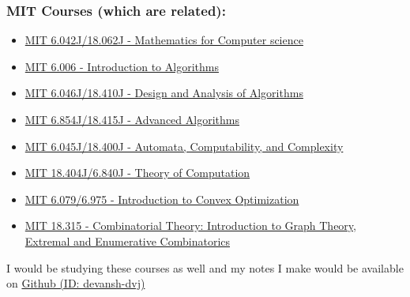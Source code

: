 \subsubsection*{MIT Courses (which are related):}
\vspace{-2mm}
\begin{itemize}[itemsep = -1 mm]
  \item \href{https://ocw.mit.edu/courses/electrical-engineering-and-computer-science/6-042j-mathematics-for-computer-science-fall-2010/}{MIT 6.042J/18.062J - Mathematics for Computer science}
  \item \href{https://ocw.mit.edu/courses/electrical-engineering-and-computer-science/6-006-introduction-to-algorithms-fall-2011/}{MIT 6.006 - Introduction to Algorithms}
  \item \href{https://ocw.mit.edu/courses/electrical-engineering-and-computer-science/6-046j-design-and-analysis-of-algorithms-spring-2015/}{MIT 6.046J/18.410J - Design and Analysis of Algorithms}
  \item \href{https://ocw.mit.edu/courses/electrical-engineering-and-computer-science/6-854j-advanced-algorithms-fall-2008/index.htm}{MIT 6.854J/18.415J - Advanced Algorithms}
  \item \href{https://ocw.mit.edu/courses/electrical-engineering-and-computer-science/6-045j-automata-computability-and-complexity-spring-2011/}{MIT 6.045J/18.400J - Automata, Computability, and Complexity}
  \item \href{https://ocw.mit.edu/courses/mathematics/18-404j-theory-of-computation-fall-2006/}{MIT 18.404J/6.840J - Theory of Computation}
  \item \href{https://ocw.mit.edu/courses/electrical-engineering-and-computer-science/6-079-introduction-to-convex-optimization-fall-2009/}{MIT 6.079/6.975 - Introduction to Convex Optimization}
  \item \href{https://ocw.mit.edu/courses/mathematics/18-315-combinatorial-theory-introduction-to-graph-theory-extremal-and-enumerative-combinatorics-spring-2005/}{MIT 18.315 - Combinatorial Theory: Introduction to Graph Theory, Extremal and Enumerative Combinatorics}
\end{itemize}

\noindent
I would be studying these courses as well and my notes I make would be available on \href{https://github.com/devansh-dvj}{Github (ID: devansh-dvj)}
